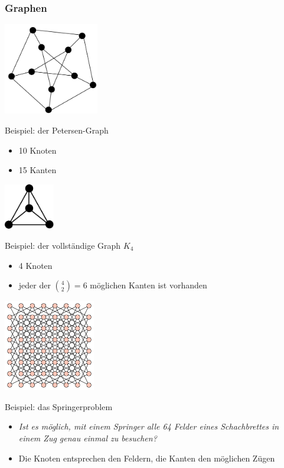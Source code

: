 \documentclass[aspectratio=1610, 11pt]{beamer}
\newcommand{\mytitle}{Graphen}
\begin{document}
\begin{frame}\frametitle{\mytitle}
	\begin{overprint}
	\hfill\includegraphics[height=40mm]{images/petersen2.pdf}
	\begin{exampleblock}{Beispiel: der Petersen-Graph}
		\begin{itemize}
			\item 10 Knoten
			\item 15 Kanten
		\end{itemize}
	\end{exampleblock}
	\hfill\includegraphics[height=20mm]{images/k4.pdf}
		\begin{exampleblock}{Beispiel: der vollst\"andige Graph $K_4$}
		\begin{itemize}
			\item 4 Knoten
			\item jeder der $\binom 42=6$ m\"oglichen Kanten ist vorhanden
		\end{itemize}
	\end{exampleblock}
	\hfill\includegraphics[height=40mm]{images/springergraph.pdf}
		\begin{exampleblock}{Beispiel: das Springerproblem}
		\begin{itemize}
			\item {\itshape Ist es m\"oglich, mit einem Springer alle 64 Felder eines Schachbrettes in einem Zug genau einmal zu besuchen?}
			\item Die Knoten entsprechen den Feldern, die Kanten den m\"oglichen Z\"ugen

\end{itemize}
\end{exampleblock}
\end{overprint}
\end{frame}
\end{document}

